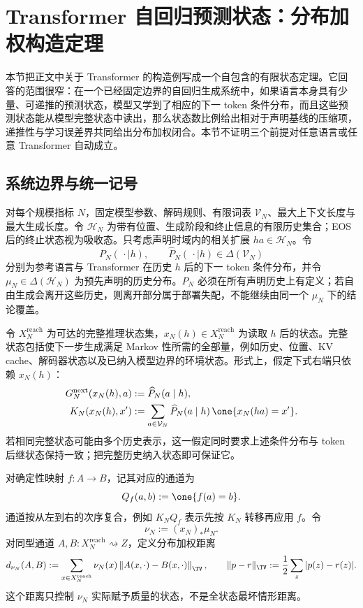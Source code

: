 \section{Transformer 自回归预测状态：分布加权构造定理}
\label{app:transformer-predictive-states}
\label{supp:transformer}

本节把正文中关于 Transformer 的构造例写成一个自包含的有限状态定理。它回答的范围很窄：在一个已经固定边界的自回归生成系统中，如果语言本身具有少量、可递推的预测状态，模型又学到了相应的下一 token 条件分布，而且这些预测状态能从模型完整状态中读出，那么状态数比例给出相对于声明基线的压缩项，递推性与学习误差界共同给出分布加权闭合。本节不证明三个前提对任意语言或任意 Transformer 自动成立。

\subsection{系统边界与统一记号}

对每个规模指标 $N$，固定模型参数、解码规则、有限词表 $\mathcal V_N$、最大上下文长度与最大生成长度。令 $\mathcal H_N$ 为带有位置、生成阶段和终止信息的有限历史集合；EOS 后的终止状态视为吸收态。只考虑声明时域内的相关扩展 $ha\in\mathcal H_N$。令
\[
 P_N(\,\cdot\mid h),\qquad \widehat P_N(\,\cdot\mid h)
 \in\Delta(\mathcal V_N)
\]
分别为参考语言与 Transformer 在历史 $h$ 后的下一 token 条件分布，并令 $\mu_N\in\Delta(\mathcal H_N)$ 为预先声明的历史分布。$P_N$ 必须在所有声明历史上有定义；若自由生成会离开这些历史，则离开部分属于部署失配，不能继续由同一个 $\mu_N$ 下的结论覆盖。

令 $X_N^{\mathrm{reach}}$ 为可达的完整推理状态集，$x_N(h)\in X_N^{\mathrm{reach}}$ 为读取 $h$ 后的状态。完整状态包括使下一步生成满足 Markov 性所需的全部量，例如历史、位置、KV cache、解码器状态以及已纳入模型边界的环境状态。形式上，假定下式右端只依赖 $x_N(h)$：
\[
 \begin{aligned}
 G_N^{\mathrm{next}}(x_N(h),a)
   &:=\widehat P_N(a\mid h),\\
 K_N(x_N(h),x')
   &:=\sum_{a\in\mathcal V_N}
      \widehat P_N(a\mid h)\,
      \one\{x_N(ha)=x'\}.
 \end{aligned}
\]
若相同完整状态可能由多个历史表示，这一假定同时要求上述条件分布与 token 后继状态保持一致；把完整历史纳入状态即可保证它。

对确定性映射 $f:A\to B$，记其对应的通道为
\[
 Q_f(a,b):=\one\{f(a)=b\}.
\]
通道按从左到右的次序复合，例如 $K_NQ_f$ 表示先按 $K_N$ 转移再应用 $f$。令
\[
 \nu_N:=(x_N)_*\mu_N.
\]
对同型通道 $A,B:X_N^{\mathrm{reach}}\rightsquigarrow Z$，定义分布加权距离
\[
 d_{\nu_N}(A,B)
 :=\sum_{x\in X_N^{\mathrm{reach}}}\nu_N(x)
   \left\|A(x,\cdot)-B(x,\cdot)\right\|_{\TV},
 \qquad
 \|p-r\|_{\TV}:=\frac12\sum_z|p(z)-r(z)|.
\]
这个距离只控制 $\nu_N$ 实际赋予质量的状态，不是全状态最坏情形距离。

